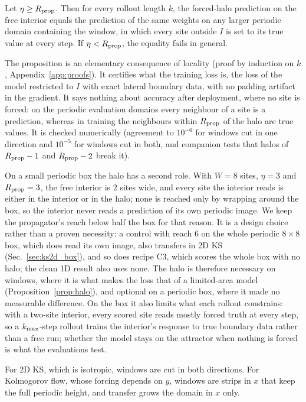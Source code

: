 \begin{proposition}
\label{prop:halo}
Let $\eta\ge R_{\mathrm{prop}}$. Then for every rollout length $k$, the forced-halo
prediction on the free interior equals the prediction of the same
weights on any larger periodic domain containing the window, in which
every site outside $I$ is set to its true value at every step. If
$\eta<R_{\mathrm{prop}}$, the equality fails in general.
\end{proposition}

The proposition is an elementary consequence of locality (proof by
induction on $k$, Appendix~\ref{app:proofs}). It certifies what the
training loss is, the loss of the model restricted to $I$ with exact
lateral boundary data, with no padding artifact in the gradient. It says
nothing about accuracy after deployment, where no site is forced: on the
periodic evaluation domains every neighbour of a site is a prediction,
whereas in training the neighbours within $R_{\mathrm{prop}}$ of the halo are true
values. It is checked numerically (agreement to $10^{-6}$ for windows
cut in one direction and $10^{-5}$ for windows cut in both, and
companion tests that halos of $R_{\mathrm{prop}}-1$ and $R_{\mathrm{prop}}-2$ break it).

On a small periodic box the halo has a second role. With $W=8$ sites,
$\eta=3$ and $R_{\mathrm{prop}}=3$, the free interior is $2$ sites wide, and every
site the interior reads is either in the interior or in the halo; none
is reached only by wrapping around the box, so the interior never reads
a prediction of its own periodic image. We keep the propagator's reach
below half the box for that reason. It is a design choice rather than a
proven necessity: a control with reach $6$ on the whole periodic $8\times8$
box, which does read its own image, also transfers in 2D KS
(Sec.~\ref{sec:ks2d_box}), and so does recipe C3, which scores the whole
box with no halo; the clean 1D result also uses none. The halo is
therefore necessary on windows, where it is what makes the loss that of a
limited-area model (Proposition~\ref{prop:halo}), and optional on a periodic
box, where it made no measurable difference. On the box it also limits
what each rollout constrains: with a two-site interior, every scored site
reads mostly forced truth at every step, so a $k_{\max}$-step rollout trains
the interior's response to true boundary data rather than a free run;
whether the model stays on the attractor when nothing is forced is what
the evaluations test.

For 2D KS, which is isotropic, windows are cut in both directions. For
Kolmogorov flow, whose forcing depends on $y$, windows are strips in $x$
that keep the full periodic height, and transfer grows the domain in $x$
only.

